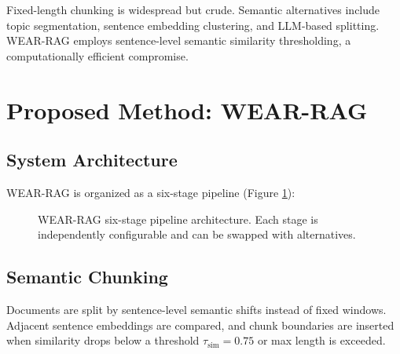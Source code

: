 \documentclass[twocolumn,11pt]{article}
\begin{document}
Fixed-length chunking is widespread but crude. Semantic alternatives include topic segmentation, sentence embedding clustering, and LLM-based splitting. WEAR-RAG employs sentence-level semantic similarity thresholding, a computationally efficient compromise.

\section{Proposed Method: WEAR-RAG}

\subsection{System Architecture}

WEAR-RAG is organized as a six-stage pipeline (Figure \ref{fig:pipeline}):

\begin{figure}[H]
\centering
{}
\caption{WEAR-RAG six-stage pipeline architecture. Each stage is independently configurable and can be swapped with alternatives.}
\label{fig:pipeline}
\end{figure}

\subsection{Semantic Chunking}

Documents are split by sentence-level semantic shifts instead of fixed windows. Adjacent sentence embeddings are compared, and chunk boundaries are inserted when similarity drops below a threshold $\tau_{\text{sim}} = 0.75$ or max length is exceeded.
\end{document}
